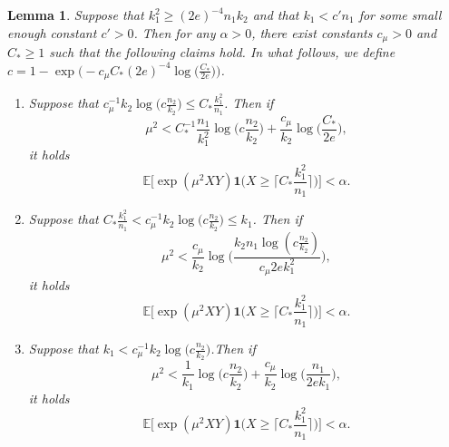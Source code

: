 \documentclass{article}
\newcommand{\EE}{\mathbb{E}}
\newcommand{\one}{\mathbf{1}}
\newcommand{\Ct}{C_{*}}
\newtheorem{lemma}{Lemma}
\begin{document}
\begin{lemma}\label{lem_lb_dense_allrates}
    Suppose that $k_1^2 \geq (2e)^{-4}n_1k_2$ and that $k_1 < c'n_1$ for some small enough constant $c'>0$.
    Then for any $\alpha > 0$, there exist constants $c_\mu > 0$ and $\Ct \geq 1$ such that the following claims hold. In what follows, we define $c = 1 - \exp\Big(-c_\mu \Ct (2e)^{-4}\log \Big(\frac{\Ct}{2e}\Big)\Big)$.

    \begin{enumerate}
        \item Suppose that $c_\mu^{-1}k_2\log\big(c\frac{n_2}{k_2}\big) \leq \Ct \frac{k_1^2}{n_1}$. Then if 
        \[\mu^2 < \Ct^{-1}\frac{n_1}{k_1^2}\log\Big(c \frac{n_2}{k_2}\Big) + \frac{c_\mu}{k_2}\log\Big(\frac{\Ct}{2e}\Big),\]
         it holds 
        \[\EE\Big[\exp(\mu^2XY)\one\big(X \geq \lceil  \Ct \frac{k_1^2}{n_1}\rceil\big)\Big] < \alpha.\]
        \item Suppose that $\Ct \frac{k_1^2}{n_1} < c_\mu^{-1}k_2\log\big(c\frac{n_2}{k_2}\big) \leq k_1$. Then if
        \[\mu^2 < \frac{c_\mu}{k_2}\log\Big(\frac{k_2n_1\log(c \frac{n_2}{k_2})}{c_\mu 2e k_1^2}\Big),\]
        it holds 
        \[\EE\Big[\exp(\mu^2XY)\one\big(X \geq \lceil  \Ct \frac{k_1^2}{n_1}\rceil\big)\Big] < \alpha.\]
        \item Suppose that $k_1 < c_\mu^{-1}k_2\log\big(c\frac{n_2}{k_2}\big)$.Then if
        \[\mu^2 < \frac{1}{k_1}\log\big(c \frac{n_2}{k_2}\big) + \frac{c_\mu}{k_2}\log\big(\frac{n_1}{2ek_1}\big),\]
        it holds 
        \[\EE\Big[\exp(\mu^2XY)\one\big(X \geq \lceil  \Ct \frac{k_1^2}{n_1}\rceil\big)\Big] < \alpha.\]
    \end{enumerate}
\end{lemma}
\end{document}

